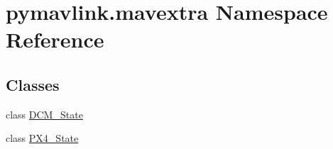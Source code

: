 \hypertarget{namespacepymavlink_1_1mavextra}{}\section{pymavlink.\+mavextra Namespace Reference}
\label{namespacepymavlink_1_1mavextra}
\subsection*{Classes}
\begin{DoxyCompactItemize}
\item 
class \hyperlink{classpymavlink_1_1mavextra_1_1DCM__State}{D\+C\+M\+\_\+\+State}
\item 
class \hyperlink{classpymavlink_1_1mavextra_1_1PX4__State}{P\+X4\+\_\+\+State}
\end{DoxyCompactItemize}
